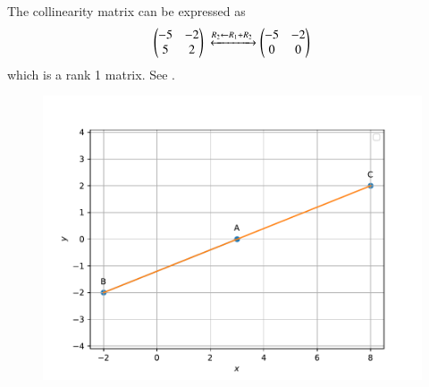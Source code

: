  The collinearity matrix can be expressed as
 \begin{align}
			    \myvec{-5 & -2
			    \\
			    5 & 2 }  
			    \xleftrightarrow[]{R_2 \leftarrow {R_1 + R_2}}
			    \myvec{	    -5 & -2  
			    \\
			    0 & 0}  
\end{align}
which is a rank 1 matrix.  See 
		.
	\begin{figure}[!ht]
		\centering
 \includegraphics[width=\columnwidth]{chapters/11/10/2/20/figs/figs6.pdf}
		\caption{}
		\label{fig:11/10/2/20}
  	\end{figure}
